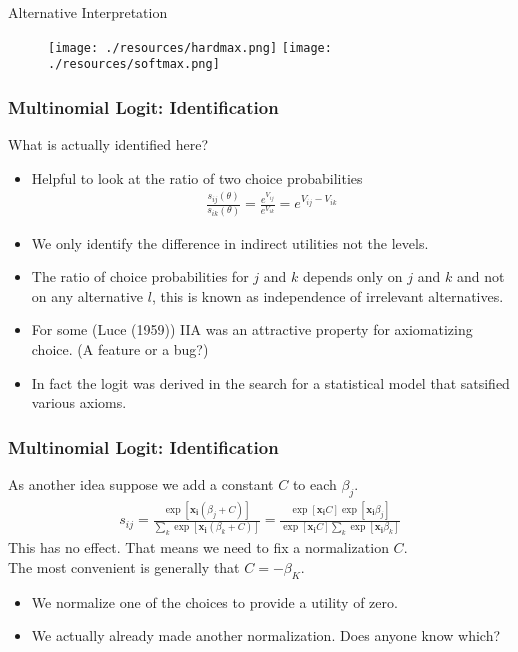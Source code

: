 \begin{frame}{Alternative Interpretation}
\begin{figure}[htbp]
\begin{center}
\texttt{[image: ./resources/hardmax.png]}
\texttt{[image: ./resources/softmax.png]}
\end{center}
\end{figure}
\end{frame}

\begin{frame}
\frametitle{Multinomial Logit: Identification}
What is actually identified here?
\begin{itemize}
\item Helpful to look at the ratio of two choice probabilities
\begin{align*}
\frac{s_{ij}(\theta)}{s_{ik}(\theta)}  = \frac{e^{V_{ij}}}{e^{V_{ik}}} = e^{V_{ij} - V_{ik}}
\end{align*}
\item We only identify the \alert{difference in indirect utilities} not the levels.
\item The ratio of choice probabilities for $j$ and $k$ depends only on $j$ and $k$ and not on any alternative $l$, this is known as \alert{independence of irrelevant alternatives}.
\item For some (Luce (1959)) IIA was an attractive property for axiomatizing choice. (A feature or a bug?)
\item In fact the logit was derived in the search for a statistical model that satsified various axioms.
\end{itemize}
\end{frame}

\begin{frame}
\frametitle{Multinomial Logit: Identification}
As another idea suppose we add a constant $C$ to each $\beta_j$.
\begin{eqnarray*}
s_{ij} = \frac{\exp[\mathbf{x_i} (\beta_j+C) ]}{\sum_k \exp[\mathbf{x_i} (\beta_k+C) ]} =  \frac{\exp[\mathbf{x_i} C] \exp[\mathbf{x_i} \beta_j ]}{\exp[\mathbf{x_i} C] \sum_k \exp[\mathbf{x_i} \beta_k ]}
\end{eqnarray*}
This has no effect.  That means we need to fix a normalization $C$.\\
 The most convenient is generally that $C = - \beta_K$.
\begin{itemize}
\item We normalize one of the choices to provide a utility of zero.
\item We actually already made another normalization. Does anyone know which?
\end{itemize}
\end{frame}


